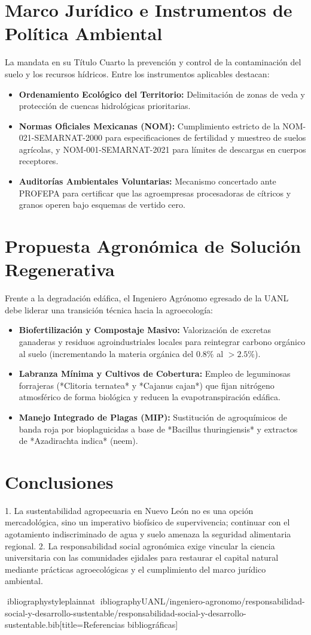 \documentclass[spanish,letterpaper,oneside]{article}
\begin{document}
\section{Marco Jurídico e Instrumentos de Política Ambiental}
La \textcite{lgeepa2024} mandata en su Título Cuarto la prevención y control de la contaminación del suelo y los recursos hídricos. Entre los instrumentos aplicables destacan:
\begin{itemize}
    \item \textbf{Ordenamiento Ecológico del Territorio:} Delimitación de zonas de veda y protección de cuencas hidrológicas prioritarias.
    \item \textbf{Normas Oficiales Mexicanas (NOM):} Cumplimiento estricto de la NOM-021-SEMARNAT-2000 para especificaciones de fertilidad y muestreo de suelos agrícolas, y NOM-001-SEMARNAT-2021 para límites de descargas en cuerpos receptores.
    \item \textbf{Auditorías Ambientales Voluntarias:} Mecanismo concertado ante PROFEPA para certificar que las agroempresas procesadoras de cítricos y granos operen bajo esquemas de vertido cero.
\end{itemize}

\section{Propuesta Agronómica de Solución Regenerativa}
Frente a la degradación edáfica, el Ingeniero Agrónomo egresado de la UANL debe liderar una transición técnica hacia la agroecología:
\begin{itemize}
    \item \textbf{Biofertilización y Compostaje Masivo:} Valorización de excretas ganaderas y residuos agroindustriales locales para reintegrar carbono orgánico al suelo (incrementando la materia orgánica del $0.8\%$ al $>2.5\%$).
    \item \textbf{Labranza Mínima y Cultivos de Cobertura:} Empleo de leguminosas forrajeras (*Clitoria ternatea* y *Cajanus cajan*) que fijan nitrógeno atmosférico de forma biológica y reducen la evapotranspiración edáfica.
    \item \textbf{Manejo Integrado de Plagas (MIP):} Sustitución de agroquímicos de banda roja por bioplaguicidas a base de *Bacillus thuringiensis* y extractos de *Azadirachta indica* (neem).
\end{itemize}

\section{Conclusiones}
1. La sustentabilidad agropecuaria en Nuevo León no es una opción mercadológica, sino un imperativo biofísico de supervivencia; continuar con el agotamiento indiscriminado de agua y suelo amenaza la seguridad alimentaria regional.
2. La responsabilidad social agronómica exige vincular la ciencia universitaria con las comunidades ejidales para restaurar el capital natural mediante prácticas agroecológicas y el cumplimiento del marco jurídico ambiental.

\newpage
ibliographystyle{plainnat}
ibliography{UANL/ingeniero-agronomo/responsabilidad-social-y-desarrollo-sustentable/responsabilidad-social-y-desarrollo-sustentable.bib}[title={Referencias bibliográficas}]
\end{document}
